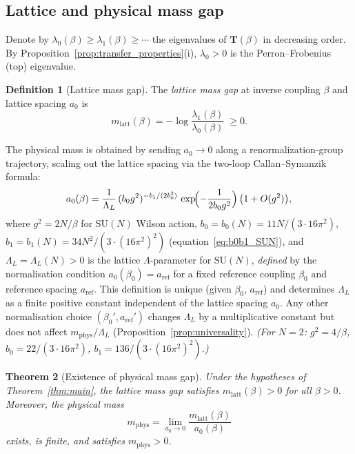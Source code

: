 \documentclass[11pt,a4paper]{amsart}
\newtheorem{theorem}{Theorem}[section]
\theoremstyle{definition}
\newtheorem{definition}[theorem]{Definition}
\newcommand{\SU}{\mathrm{SU}}
\begin{document}
\subsection{Lattice and physical mass gap}
\label{sec:mass_def}

Denote by $\lambda_0(\beta) \ge \lambda_1(\beta) \ge \cdots$ the eigenvalues of
$\mathbf{T}(\beta)$ in decreasing order.  By Proposition~\ref{prop:transfer_properties}(i),
$\lambda_0 > 0$ is the Perron--Frobenius (top) eigenvalue.

\begin{definition}[Lattice mass gap]
\label{def:lattice_mass}
The \emph{lattice mass gap} at inverse coupling $\beta$ and lattice spacing $a_0$ is
\[
   m_{\mathrm{latt}}(\beta) = -\log\!\frac{\lambda_1(\beta)}{\lambda_0(\beta)}
   \;\ge 0.
\]
\end{definition}

The physical mass is obtained by sending $a_0\to 0$ along a renormalization-group
trajectory, scaling out the lattice spacing via the two-loop Callan--Symanzik formula:
\begin{equation}
\label{eq:lattice_spacing}
a_0(\beta) = \frac{1}{\Lambda_L}\,
   (b_0 g^2)^{-b_1/(2b_0^2)}\,
   \exp\!\Bigl(-\frac{1}{2b_0 g^2}\Bigr)\,
   \bigl(1 + O(g^2)\bigr),
\end{equation}
where $g^2 = 2N/\beta$ for $\SU(N)$ Wilson action, $b_0 = b_0(N) = 11N/(3\cdot 16\pi^2)$,
$b_1 = b_1(N) = 34N^2/(3\cdot(16\pi^2)^2)$ (equation~\eqref{eq:b0b1_SUN}),
and $\Lambda_L = \Lambda_L(N) > 0$ is the lattice $\Lambda$-parameter for $\SU(N)$,
\emph{defined} by the normalisation condition $a_0(\beta_0) = a_{\mathrm{ref}}$
for a fixed reference coupling $\beta_0$ and reference spacing $a_{\mathrm{ref}}$.
This definition is unique (given $\beta_0$, $a_{\mathrm{ref}}$) and determines
$\Lambda_L$ as a finite positive constant independent of the lattice spacing $a_0$.
Any other normalisation choice $(\beta_0', a_{\mathrm{ref}}')$ changes $\Lambda_L$
by a multiplicative constant but does not affect $m_{\mathrm{phys}}/\Lambda_L$
(Proposition~\ref{prop:universality}).
\emph{(For $N=2$: $g^2 = 4/\beta$, $b_0 = 22/(3\cdot 16\pi^2)$, $b_1 = 136/(3\cdot(16\pi^2)^2)$.)}

\begin{theorem}[Existence of physical mass gap]
\label{thm:phys_mass}
Under the hypotheses of Theorem~\ref{thm:main}, the lattice mass gap satisfies
$m_{\mathrm{latt}}(\beta) > 0$ for all $\beta > 0$.  Moreover, the physical mass
\begin{equation}
\label{eq:mphys}
   m_{\mathrm{phys}} = \lim_{a_0\to 0} \frac{m_{\mathrm{latt}}(\beta)}{a_0(\beta)}
\end{equation}
exists, is finite, and satisfies $m_{\mathrm{phys}} > 0$.
\end{theorem}
\end{document}

